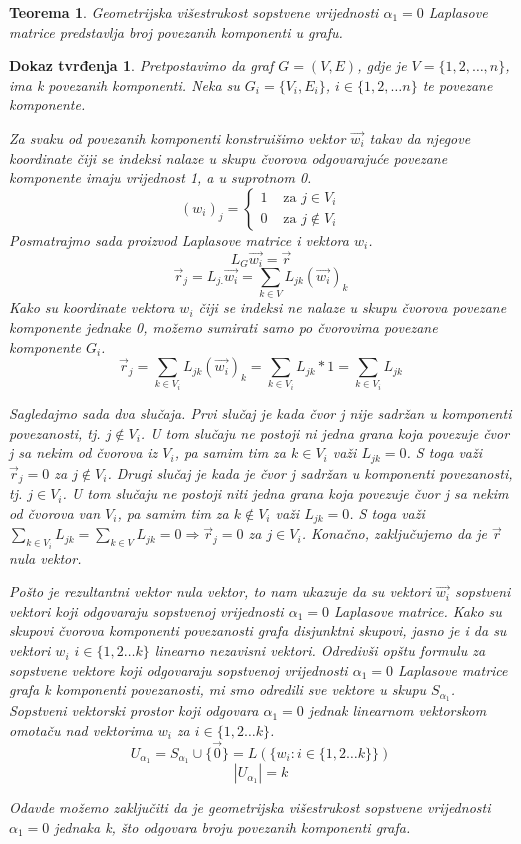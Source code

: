 \documentclass[11pt]{article}
\newtheorem{theorem}{Teorema}
\newtheorem*{custom_proof}{Dokaz tvrđenja}
\begin{document}
	\begin{theorem} 
	Geometrijska višestrukost sopstvene vrijednosti $\alpha_1 = 0$ Laplasove matrice predstavlja broj povezanih komponenti u grafu.
	\end{theorem}
	
	\begin{custom_proof}
	Pretpostavimo da graf $G = (V, E)$, gdje je $V = \{1, 2, \dots, n\}$, ima k povezanih komponenti. Neka su $G_i = \{V_i,E_i\}$, $i \in \{1,2, \dots n\}$ te povezane komponente.

	Za svaku od povezanih komponenti konstruišimo vektor $\vec{w_i}$ takav da njegove koordinate čiji se indeksi nalaze u skupu čvorova odgovarajuće povezane komponente imaju vrijednost 1, a u suprotnom 0.
	\[
	 (w_{i})_j =
	 \begin{cases}
	 1  & \text{ za } j \in V_i \\ 
	 0  & \text{ za } j \notin V_i
	 \end{cases}
	\]
	Posmatrajmo sada proizvod Laplasove matrice i vektora $w_i$.
	\[
	L_G\vec{w_i} = \vec{r}
	\]
	\[
	\vec{r}_j = L_{j.} \vec{w_i} = \sum_{ k  \in V} L_{jk}(\vec{w_{i}})_k 
	\]
	Kako su koordinate vektora $w_i$ čiji se indeksi ne nalaze u skupu čvorova povezane komponente jednake 0, možemo sumirati samo po čvorovima povezane komponente $G_i$. 
	\[
	\vec{r}_j = \sum_{ k  \in V_i} L_{jk}(\vec{w_{i}})_k = \sum_{ k  \in V_i} L_{jk} * 1 = \sum_{ k  \in V_i} L_{jk}
	\]

	Sagledajmo sada dva slučaja. Prvi slučaj je kada čvor j nije sadržan u komponenti povezanosti, tj. $j \notin V_i$.
	U tom slučaju ne postoji ni jedna grana koja povezuje čvor j sa nekim od čvorova iz $V_i$, pa samim tim za $k \in V_i$ važi $L_{jk} = 0$.
	S toga važi $\vec{r}_j = 0$ za $j \notin V_i$.
	Drugi slučaj je kada je čvor j sadržan u komponenti povezanosti, tj. $j \in V_i$.
	U tom slučaju ne postoji niti jedna grana koja povezuje čvor j sa nekim od čvorova van $V_i$, pa samim tim za $k \notin V_i$ važi $L_{jk} = 0$.
	S toga važi $ \sum_{k \in V_i}L_{jk} = \sum_{k \in V}L_{jk} = 0 \Rightarrow \vec{r}_j = 0$ za $j \in V_i$. Konačno, zaključujemo da je $\vec{r}$ nula vektor.
	
	Pošto je rezultantni vektor nula vektor, to nam ukazuje da su vektori $\vec{w_i}$ sopstveni vektori koji odgovaraju sopstvenoj vrijednosti $\alpha_1 = 0$ Laplasove matrice.
	Kako su skupovi čvorova komponenti povezanosti grafa disjunktni skupovi, jasno je i da su vektori $w_i$ $i \in \{1,2 \dots k\}$ linearno nezavisni vektori.
	Odredivši opštu formulu za sopstvene vektore koji odgovaraju sopstvenoj vrijednosti $\alpha_1 = 0$ Laplasove matrice grafa k komponenti povezanosti, mi smo odredili sve vektore u skupu $S_{\alpha_1}$.
	Sopstveni vektorski prostor koji odgovara $\alpha_1 = 0$ jednak linearnom vektorskom omotaču nad vektorima $w_i$ za $i \in \{1,2 \dots k\}$.
	\[
	U_{\alpha_1} = S_{\alpha_1} \cup \{\vec{0}\}= L (\{ w_i : i \in \{1,2 \dots k\}\})
	\]
	\[
	|U_{\alpha_1}| = k
	\]
	
	Odavde možemo zaključiti da je geometrijska višestrukost sopstvene vrijednosti $\alpha_1 = 0$ jednaka k, što odgovara broju povezanih komponenti grafa.
	\end{custom_proof}
\end{document}
